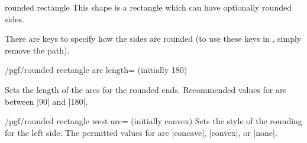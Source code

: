 \begin{shape}{rounded rectangle}
	This shape is a rectangle which can have optionally rounded sides.

\begin{codeexample}[]
\end{codeexample}

	There are keys to specify how the sides are rounded (to use
	these keys in \tikzname, simply remove the  path).


\begin{key}{/pgf/rounded rectangle arc length= (initially 180)}

	Sets the length of the arcs for the rounded ends. Recommended values
	for	 are between |90| and |180|.
	
\begin{codeexample}[]
\end{codeexample}

\end{key}

\begin{key}{/pgf/rounded rectangle west arc= (initially convex)}
	Sets the style of the rounding for the left side. The permitted values
	for  are |concave|, |convex|, or |none|.

\begin{codeexample}[]
\end{codeexample}
\end{key}


\end{shape}
